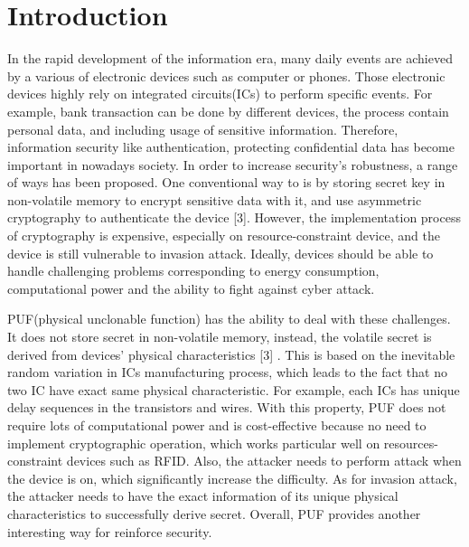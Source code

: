 \chapter{Introduction}
In the rapid development of the information era, many daily events are achieved by a various of electronic devices such as computer or phones.
Those electronic devices highly rely on integrated circuits(ICs) to perform specific events. For example, bank transaction can be done by different devices,
the process contain personal data, and including usage of sensitive information. Therefore, information security like authentication, protecting confidential data
has become important in nowadays society. In order to increase security's robustness, a range of ways has been proposed. One conventional way to is by storing secret key in non-volatile memory to encrypt sensitive data with it,
and use asymmetric cryptography to authenticate the device [3]. However, the implementation process of cryptography is expensive, especially on resource-constraint device, and the device is still vulnerable to invasion attack. Ideally, devices should be able to handle challenging problems corresponding to energy consumption, 
computational power and the ability to fight against cyber attack. \par

PUF(physical unclonable function) has the ability to deal with these challenges. It does not store secret in non-volatile memory, instead, the volatile secret is derived from devices' physical characteristics [3] .
This is based on the inevitable random variation in ICs manufacturing process, which leads to the fact that no two IC have exact same physical characteristic. For example, each ICs has unique delay sequences in the transistors and wires.
With this property, PUF does not require lots of computational power and is cost-effective because no need to implement cryptographic operation, which works particular well on
resources-constraint devices such as RFID. Also, the attacker needs to perform attack when the device is on, which significantly increase the difficulty. As for invasion attack, 
the attacker needs to have the exact information of its unique physical characteristics to successfully derive secret. Overall, PUF provides another interesting way for reinforce security.

